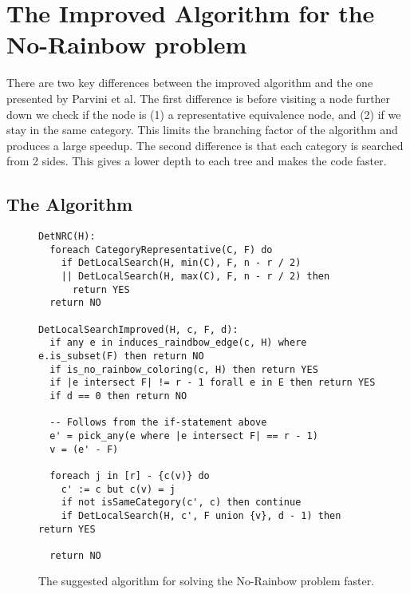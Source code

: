 \documentclass{book}
\theoremstyle{definition}
\begin{document}
\chapter{The Improved Algorithm for the No-Rainbow problem}
There are two key differences between the improved algorithm and the one presented by Parvini et al. The first difference is before visiting a node further down we check if the node is (1) a representative equivalence node, and (2) if we stay in the same category. This limits the branching factor of the algorithm and produces a large speedup. The second difference is that each category is searched from 2 sides. This gives a lower depth to each tree and makes the code faster.

\section{The Algorithm}
\begin{figure}
\begin{verbatim}
DetNRC(H):
  foreach CategoryRepresentative(C, F) do
    if DetLocalSearch(H, min(C), F, n - r / 2)
    || DetLocalSearch(H, max(C), F, n - r / 2) then
      return YES
  return NO

DetLocalSearchImproved(H, c, F, d):
  if any e in induces_raindbow_edge(c, H) where e.is_subset(F) then return NO
  if is_no_rainbow_coloring(c, H) then return YES
  if |e intersect F| != r - 1 forall e in E then return YES
  if d == 0 then return NO

  -- Follows from the if-statement above
  e' = pick_any(e where |e intersect F| == r - 1)
  v = (e' - F)

  foreach j in [r] - {c(v)} do
    c' := c but c(v) = j
    if not isSameCategory(c', c) then continue
    if DetLocalSearch(H, c', F union {v}, d - 1) then return YES

  return NO
\end{verbatim}
\label{alg:nrc++}
\caption{The suggested algorithm for solving the No-Rainbow problem faster.}

\end{figure}

\end{document}
